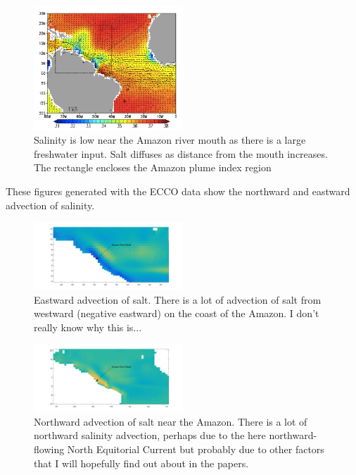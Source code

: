 \documentclass[12pt,a4paper]{article}
\begin{document}
\begin{figure}[H]
        \centering
        \includegraphics[width=0.5\textwidth]{amazon-diffusion}
        \caption{Salinity is low near the Amazon river mouth as there is a large freshwater input. Salt diffuses as distance from the mouth increases. The rectangle encloses the Amazon plume index region}
\end{figure}

These figures generated with the ECCO data show the northward and eastward advection of salinity.

\begin{figure}[H]
        \centering
        \includegraphics[width=0.5\textwidth]{river-mouth-east-salt}
        \caption{Eastward advection of salt. There is a lot of advection of salt from westward (negative eastward) on the coast of the Amazon. I don't really know why this is...}
\end{figure}

\begin{figure}[H]
        \centering
        \includegraphics[width=0.5\textwidth]{river-mouth-north-salt}
        \caption{Northward advection of salt near the Amazon. There is a lot of northward salinity advection, perhaps due to the here northward-flowing North Equitorial Current but probably due to other factors that I will hopefully find out about in the papers.}
\end{figure}
\end{document}
